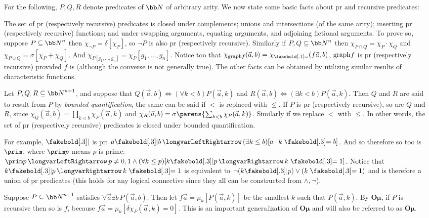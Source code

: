 For the following, $P,Q,R$ denote predicates of ${\bb N}$ of arbitrary arity.
We now state some basic facts about pr and recursive predicates:

\benum
    \item The set of pr (respectively recursive) predicates is closed under complements; unions and intersections (of the same arity); inserting pr (respectively recursive) functions; and under swapping
    arguments, equating arguments, and adjoining fictional arguments.
    To prove so, suppose $P\subseteq{\bb N}^n$ then $\chi_{\neg P}=\delta[\chi_P]$, so $\neg P$ is also pr (respectively recursive).
    Similarly if $P,Q\subseteq{\bb N}^n$ then $\chi_{P\cap Q}=\chi_P\cdot\chi_Q$ and $\chi_{P\cup Q}=\sigma[\chi_P+\chi_Q]$.
    And $\chi_{P[g_1,\dots,g_n]}=\chi_P[g_1,\dots,g_n]$.
    Notice too that $\chi_{{\rm graph}f}(\vec a,b)=\chi_{\eq}(f\vec a,b)$, ${\rm graph}f$ is pr (respectively recursive) provided $f$ is (although the converse is not generally true).
    The other facts can be obtained by utilizing similar results of characteristic functions.

    \item Let $P,Q,R\subseteq{\bb N}^{n+1}$, and suppose that $Q(\vec a,b)\iff(\forall k<b)P(\vec a,k)$ and $R(\vec a,b)\iff(\exists k<b)P(\vec a,k)$.
    Then $Q$ and $R$ are said to result from $P$ by {\it bounded quantification}, the same can be said if $<$ is replaced with $\leq$.
    If $P$ is pr (respectively recursive), so are $Q$ and $R$, since $\chi_Q(\vec a,b)=\prod_{k<b}\chi_P(\vec a,k)$ and $\chi_R(\vec a,b)=\sigma\parens{\sum_{k<b}\chi_P(\vec a,k)}$.
    Similarly if we replace $<$ with $\leq$.
    In other words, the set of pr (respectively recursive) predicates is closed under bounded quantification.

    For example, $\bdivs$ is pr: $a\bdivs b\iff(\exists k\leq b)[a\cdot k\eq b]$.
    And so therefore so too is $\prim$, where $\prim p$ means $p$ is prime: $\prim p\iff p\neq 0,1\land(\forall k\leq p)[k\bdivs p\implies k\eq1]$.
    Notice that $k\bdivs p\implies k\eq1$ is equivalent to $\neg(k\bdivs p)\lor(k\eq 1)$ and is therefore a union of pr predicates (this holds for any logical connective since they all can be constructed
    from $\land,\neg$).

    \item Suppose $P\subseteq{\bb N}^{n+1}$ satisfies $\forall\vec a\exists b\,P(\vec a,b)$.
    Then let $f\vec a=\mu_k[P(\vec a,k)]$ be the smallest $k$ such that $P(\vec a,k)$.
    By $\boldsymbol{O\mu}$, if $P$ is recursive then so is $f$, because $f\vec a=\mu_k[\delta\chi_P(\vec a,k)=0]$.
    This is an important generalization of $\boldsymbol{O\mu}$ and will also be referred to as $\boldsymbol{O\mu}$.

